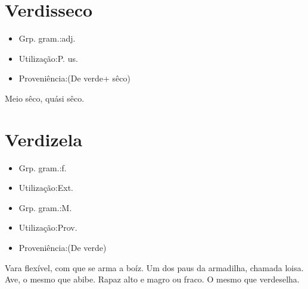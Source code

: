 \documentclass{article}
\begin{document}
\section{Verdisseco}
\begin{itemize}
\item {Grp. gram.:adj.}
\end{itemize}
\begin{itemize}
\item {Utilização:P. us.}
\end{itemize}
\begin{itemize}
\item {Proveniência:(De \textunderscore verde\textunderscore  + \textunderscore sêco\textunderscore )}
\end{itemize}
Meio sêco, quási sêco.
\section{Verdizela}
\begin{itemize}
\item {Grp. gram.:f.}
\end{itemize}
\begin{itemize}
\item {Utilização:Ext.}
\end{itemize}
\begin{itemize}
\item {Grp. gram.:M.}
\end{itemize}
\begin{itemize}
\item {Utilização:Prov.}
\end{itemize}
\begin{itemize}
\item {Proveniência:(De \textunderscore verde\textunderscore )}
\end{itemize}
Vara flexível, com que se arma a boíz.
Um dos paus da armadilha, chamada loisa.
Ave, o mesmo que \textunderscore abibe\textunderscore .
Rapaz alto e magro ou fraco.
O mesmo que \textunderscore verdeselha\textunderscore .
\end{document}
